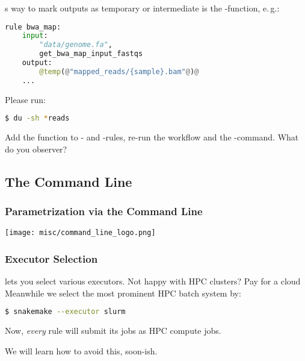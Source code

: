 \begin{frame}[fragile]
  \frametitle{}
  \Snakemake{}s way to mark outputs as temporary or intermediate is the -function, e.\,g.:
  \begin{lstlisting}[language=Python,style=Python]
rule bwa_map:
    input:
        "data/genome.fa",
        get_bwa_map_input_fastqs
    output:
        @temp(@"mapped_reads/{sample}.bam"@)@
    ...
  \end{lstlisting}
  \pause
  Please run:
  \begin{lstlisting}[language=Bash, style=Shell]
$ du -sh *reads
  \end{lstlisting}
  Add the  function to - and -rules, re-run the workflow and the -command. What do you observer?
\end{frame}

\subsection{The Command Line}

\begin{frame}
  \frametitle{Parametrization via the Command Line}
  \centering
  \texttt{[image: misc/command\_line\_logo.png]}
\end{frame}

\begin{frame}[fragile]
  \frametitle{Executor Selection}
  \Snakemake{} lets you select various executors. Not happy with HPC clusters? Pay for a cloud  \newline
  Meanwhile we select the most prominent HPC batch system by:
  \begin{lstlisting}[language=Bash, style=Shell]
$ snakemake --executor slurm
  \end{lstlisting}
  Now, \emph{every} rule will submit its jobs as HPC compute jobs.
  \begin{hint}
  	We will learn how to avoid this, soon-ish.
  \end{hint}
\end{frame}

